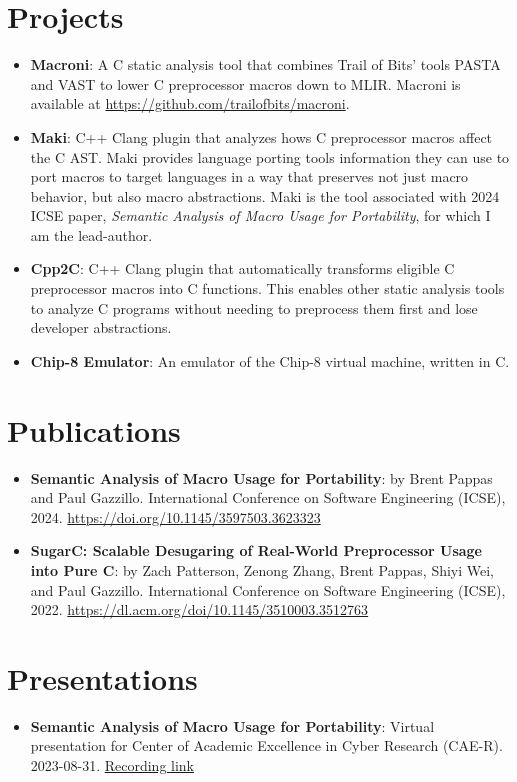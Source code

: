 \documentclass{article}
\newcommand{\resumeItem}[2]{
  \item\small{
    \textbf{#1}{: #2 \vspace{-2pt}}
  }
}
\newcommand{\resumeSubItem}[2]{\resumeItem{#1}{#2}\vspace{-3pt}}
\newcommand{\resumeSubHeadingListStart}{\begin{itemize}[leftmargin=*, label={}]}
\newcommand{\resumeSubHeadingListEnd}{\end{itemize}}
\begin{document}
\section{Projects}
\resumeSubHeadingListStart{}
\resumeItem{Macroni}
{A C static analysis tool that combines Trail of Bits' tools
	PASTA and VAST to lower C preprocessor macros down to MLIR.\@
	Macroni is available at \href{https://github.com/trailofbits/macroni}{https://github.com/trailofbits/macroni}.}
\resumeItem{Maki}
{C++ Clang plugin that analyzes hows C preprocessor macros affect the C AST\@.
Maki provides language porting tools information they can use to port macros to
target languages in a way that preserves not just macro behavior, but also macro
abstractions. Maki is the tool associated with 2024 ICSE paper,
\textit{Semantic Analysis of Macro Usage for Portability}, for which I am the lead-author.}
\vspace{2pt}
\resumeItem{Cpp2C}
{C++ Clang plugin that automatically transforms eligible C preprocessor macros into C functions.
	This enables other static analysis tools to analyze C programs without needing to preprocess them first and lose developer abstractions.}
\vspace{2pt}
\resumeItem{Chip-8 Emulator}
{An emulator of the Chip-8 virtual machine, written in C.}
\resumeSubHeadingListEnd{}

\vspace{-5pt}
\section{Publications}
\resumeSubHeadingListStart{}

\resumeSubItem{Semantic Analysis of Macro Usage for Portability}
{by Brent Pappas and Paul Gazzillo. International Conference on Software Engineering (ICSE), 2024. \url{https://doi.org/10.1145/3597503.3623323}}

\resumeSubItem{SugarC\@: Scalable Desugaring of Real-World Preprocessor Usage into Pure C}
{by Zach Patterson, Zenong Zhang, Brent Pappas, Shiyi Wei, and Paul Gazzillo. International Conference on Software Engineering (ICSE), 2022. \url{https://dl.acm.org/doi/10.1145/3510003.3512763}}
\resumeSubHeadingListEnd{}

\vspace{-5pt}
\section{Presentations}
\resumeSubHeadingListStart{}
\resumeSubItem{Semantic Analysis of Macro Usage for Portability}
{Virtual presentation for Center of Academic Excellence in Cyber Research (CAE-R). 2023{-}08{-}31. \href{https://drive.google.com/file/d/1xCd34w54hs1iyaoXHz0MUkwlH-fP3HLo/view} {Recording link}}
\resumeSubHeadingListEnd{}
\end{document}
